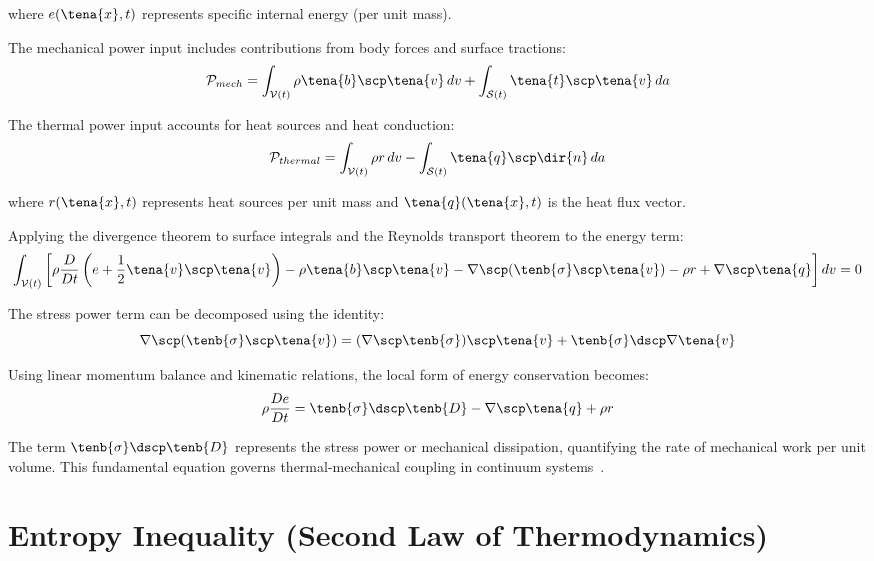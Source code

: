 where $e(\tena{x}, t)$ represents specific internal energy (per unit mass).

The mechanical power input includes contributions from body forces and surface tractions:
\begin{equation}
\mathcal{P}_{mech} = \int_{\mathcal{V}(t)} \rho \tena{b} \scp \tena{v} \, dv + \int_{\mathcal{S}(t)} \tena{t} \scp \tena{v} \, da
\end{equation}

The thermal power input accounts for heat sources and heat conduction:
\begin{equation}
\mathcal{P}_{thermal} = \int_{\mathcal{V}(t)} \rho r \, dv - \int_{\mathcal{S}(t)} \tena{q} \scp \dir{n} \, da
\end{equation}

where $r(\tena{x}, t)$ represents heat sources per unit mass and $\tena{q}(\tena{x}, t)$ is the heat flux vector.

Applying the divergence theorem to surface integrals and the Reynolds transport theorem to the energy term:
\begin{equation}
\int_{\mathcal{V}(t)} \left[\rho \frac{D}{Dt}\left(e + \frac{1}{2}\tena{v} \scp \tena{v}\right) - \rho \tena{b} \scp \tena{v} - \nabla \scp (\tenb{\sigma} \scp \tena{v}) - \rho r + \nabla \scp \tena{q}\right] dv = 0
\end{equation}

The stress power term can be decomposed using the identity:
\begin{equation}
\nabla \scp (\tenb{\sigma} \scp \tena{v}) = (\nabla \scp \tenb{\sigma}) \scp \tena{v} + \tenb{\sigma} \dscp \nabla \tena{v}
\end{equation}

Using linear momentum balance and kinematic relations, the local form of energy conservation becomes:
\begin{equation}
\rho \frac{De}{Dt} = \tenb{\sigma} \dscp \tenb{D} - \nabla \scp \tena{q} + \rho r
\end{equation}

The term $\tenb{\sigma} \dscp \tenb{D}$ represents the stress power or mechanical dissipation, quantifying the rate of mechanical work per unit volume. This fundamental equation governs thermal-mechanical coupling in continuum systems~\autocite{Sadd.2019}.

\section{Entropy Inequality (Second Law of Thermodynamics)}

